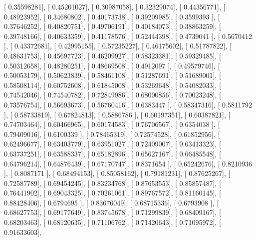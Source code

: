 \documentclass{article}
\begin{document}
       [ 0.35598281],
       [ 0.45201027],
       [ 0.30987058],
       [ 0.32329074],
       [ 0.44356771],
       [ 0.48923952],
       [ 0.34680802],
       [ 0.40173738],
       [ 0.39209985],
       [ 0.3599393 ],
       [ 0.37646252],
       [ 0.40820751],
       [ 0.49706191],
       [ 0.40184073],
       [ 0.38863259],
       [ 0.39748166],
       [ 0.40633359],
       [ 0.41178576],
       [ 0.52444398],
       [ 0.4739041 ],
       [ 0.5670412 ],
       [ 0.43372681],
       [ 0.42995155],
       [ 0.57235227],
       [ 0.46175602],
       [ 0.51787822],
       [ 0.48631753],
       [ 0.45697723],
       [ 0.46209927],
       [ 0.58323381],
       [ 0.59329485],
       [ 0.50312658],
       [ 0.48280251],
       [ 0.48669508],
       [ 0.4912097 ],
       [ 0.49579746],
       [ 0.50053179],
       [ 0.50623839],
       [ 0.58461108],
       [ 0.51287691],
       [ 0.51689001],
       [ 0.58508114],
       [ 0.60752608],
       [ 0.61845008],
       [ 0.53269648],
       [ 0.54082033],
       [ 0.74542046],
       [ 0.74540782],
       [ 0.72849986],
       [ 0.68000856],
       [ 0.70023248],
       [ 0.73576754],
       [ 0.56693673],
       [ 0.56760416],
       [ 0.6383447 ],
       [ 0.58347316],
       [ 0.5811792 ],
       [ 0.58733819],
       [ 0.67824813],
       [ 0.5886786 ],
       [ 0.60197351],
       [ 0.60387821],
       [ 0.74703464],
       [ 0.60466965],
       [ 0.60174583],
       [ 0.76706567],
       [ 0.6354038 ],
       [ 0.79409016],
       [ 0.6100339 ],
       [ 0.78465319],
       [ 0.72574528],
       [ 0.61852956],
       [ 0.62496677],
       [ 0.63403779],
       [ 0.63951027],
       [ 0.72409007],
       [ 0.63413323],
       [ 0.63737251],
       [ 0.63588337],
       [ 0.65182896],
       [ 0.65627167],
       [ 0.66485548],
       [ 0.64796214],
       [ 0.64876439],
       [ 0.67170747],
       [ 0.8371654 ],
       [ 0.65242676],
       [ 0.8210936 ],
       [ 0.8087171 ],
       [ 0.68494153],
       [ 0.85058162],
       [ 0.79181231],
       [ 0.87625267],
       [ 0.72587789],
       [ 0.69454245],
       [ 0.83234768],
       [ 0.87653553],
       [ 0.85857487],
       [ 0.76441902],
       [ 0.69043325],
       [ 0.70261061],
       [ 0.89767572],
       [ 0.81160145],
       [ 0.88428406],
       [ 0.6794695 ],
       [ 0.83676049],
       [ 0.68715336],
       [ 0.6793908 ],
       [ 0.68627753],
       [ 0.69177649],
       [ 0.83745678],
       [ 0.71299839],
       [ 0.68409167],
       [ 0.68203463],
       [ 0.68120635],
       [ 0.71106762],
       [ 0.71420643],
       [ 0.71095972],
       [ 0.91633603],
\end{document}
